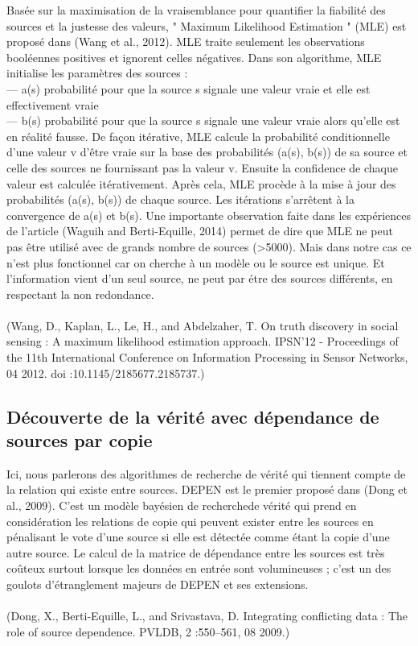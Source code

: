 \documentclass[12pt]{report}
\begin{document}
Basée sur la maximisation de la vraisemblance pour quantifier la fiabilité
des sources et la justesse des valeurs, " Maximum Likelihood Estimation "
(MLE) est proposé dans (Wang et al., 2012). MLE traite seulement les
observations booléennes positives et ignorent celles négatives. Dans son
algorithme, MLE initialise les paramètres des sources :
\\— a(s) probabilité pour que la source s signale une valeur vraie et elle est
effectivement vraie
\\— b(s) probabilité pour que la source s signale une valeur vraie alors
qu’elle est en réalité fausse.
De façon itérative, MLE calcule la probabilité conditionnelle d’une valeur
v d’être vraie sur la base des probabilités (a(s), b(s)) de sa source et celle
des sources ne fournissant pas la valeur v. Ensuite la confidence de chaque
valeur est calculée itérativement. Après cela, MLE procède à la mise à jour
des probabilités (a(s), b(s)) de chaque source. Les itérations s’arrêtent à la
convergence de a(s) et b(s). Une importante observation faite dans les
expériences de l’article (Waguih and Berti-Equille, 2014) permet de dire
que MLE ne peut pas être utilisé avec de grands nombre de sources
(>5000).
Mais dans notre cas ce n’est plus fonctionnel car on cherche à un modèle
ou le source est unique. Et l’information vient d’un seul source, ne peut
par étre des sources différents, en respectant la non redondance.
\\ \\(Wang, D., Kaplan, L., Le, H., and Abdelzaher, T. On truth discovery in
social sensing : A maximum likelihood estimation approach. IPSN’12 -
Proceedings of the 11th International Conference on Information
Processing in Sensor Networks, 04 2012. doi :10.1145/2185677.2185737.)

\subsection{Découverte de la vérité avec dépendance de sources par copie}

Ici, nous parlerons des algorithmes de recherche de vérité qui tiennent
compte de la relation qui existe entre sources. DEPEN est le premier
proposé dans (Dong et al., 2009). C’est un modèle bayésien de recherchede vérité qui prend en considération les relations de copie qui peuvent
exister entre les sources en pénalisant le vote d’une source si elle est
détectée comme étant la copie d’une autre source. Le calcul de la matrice
de dépendance entre les sources est très coûteux surtout lorsque les
données en entrée sont volumineuses ; c’est un des goulots d’étranglement
majeurs de DEPEN et ses extensions.
\\ \\(Dong, X., Berti-Equille, L., and Srivastava, D. Integrating conflicting data
: The role of source dependence. PVLDB, 2 :550–561, 08 2009.)
\end{document}
